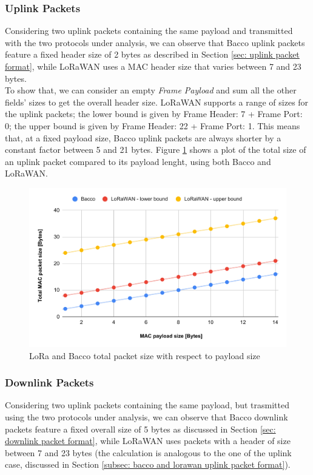 \subsubsection{Uplink Packets}
\label{subsec: bacco and lorawan uplink packet format}
Considering two uplink packets containing the same payload and transmitted with the two protocols under
analysis, we can observe that Bacco uplink packets feature a fixed header size of 2 bytes as described in Section \ref{sec:
uplink packet format}, while LoRaWAN uses a MAC header size that varies between 7 and 23 bytes.\\
To show that, we can consider an empty \textit{Frame Payload} and sum all the other
fields' sizes to get the overall header size. LoRaWAN supports a range of sizes for the uplink packets; the lower bound
is given by Frame Header: 7 + Frame Port: 0; the upper bound is given by Frame Header: 22 + Frame Port: 1. This means
that, at a fixed payload size, Bacco uplink packets are always shorter by a constant factor between 5 and 21 bytes.
Figure \ref{img: uplink packet size} shows a plot of the total size of an uplink packet compared to its payload lenght,
using both Bacco and LoRaWAN.

\begin{figure}[ht]
    \centering
    \includegraphics[width=1.0\textwidth]{images/uplink_packet_size.pdf}
    \caption{LoRa and Bacco total packet size with respect to payload size}
    \label{img: uplink packet size}
\end{figure}


\subsubsection{Downlink Packets}
Considering two uplink packets containing the same payload, but trasmitted using the two protocols under analysis, we
can observe that Bacco downlink packets feature a fixed overall size of 5 bytes as discussed in Section \ref{sec:
downlink packet format}, while LoRaWAN uses packets with a header of size between 7 and 23 bytes (the
calculation is analogous to the one of the uplink case, discussed in Section \ref{subsec: bacco and lorawan uplink
packet format}).
